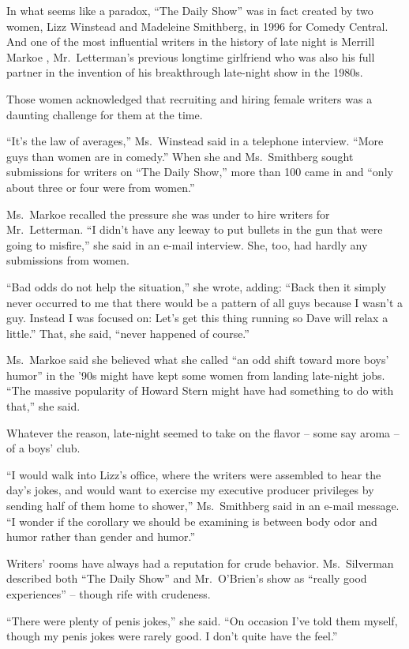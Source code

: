 ﻿\documentclass[12pt]{article}
\begin{document}
In what seems like a paradox, ``The Daily Show'' was in fact created by two women, Lizz Winstead and
Madeleine Smithberg, in 1996 for Comedy Central. And one of the most influential writers in the
history of late night is Merrill Markoe , Mr.~Letterman's previous longtime girlfriend who was also
his full partner in the invention of his breakthrough late-night show in the 1980s.

Those women acknowledged that recruiting and hiring female writers was a daunting challenge for them
at the time.

``It's the law of averages,'' Ms.~Winstead said in a telephone interview. ``More guys than women are
in comedy.'' When she and Ms.~Smithberg sought submissions for writers on ``The Daily Show,'' more
than 100 came in and ``only about three or four were from women.''

Ms.~Markoe recalled the pressure she was under to hire writers for Mr.~Letterman. ``I didn't have
any leeway to put bullets in the gun that were going to misfire,'' she said in an e-mail interview.
She, too, had hardly any submissions from women.

``Bad odds do not help the situation,'' she wrote, adding: ``Back then it simply never occurred to
me that there would be a pattern of all guys because I wasn't a guy. Instead I was focused on: Let's
get this thing running so Dave will relax a little.'' That, she said, ``never happened of course.''

Ms.~Markoe said she believed what she called ``an odd shift toward more boys' humor'' in the '90s
might have kept some women from landing late-night jobs. ``The massive popularity of Howard Stern
might have had something to do with that,'' she said.

Whatever the reason, late-night seemed to take on the flavor -- some say aroma -- of a boys' club.

``I would walk into Lizz's office, where the writers were assembled to hear the day's jokes, and
would want to exercise my executive producer privileges by sending half of them home to shower,''
Ms.~Smithberg said in an e-mail message. ``I wonder if the corollary we should be examining is
between body odor and humor rather than gender and humor.''

Writers' rooms have always had a reputation for crude behavior. Ms.~Silverman described both ``The
Daily Show'' and Mr.~O'Brien's show as ``really good experiences'' -- though rife with crudeness.

``There were plenty of penis jokes,'' she said. ``On occasion I've told them myself, though my penis
jokes were rarely good. I don't quite have the feel.''
\end{document}
